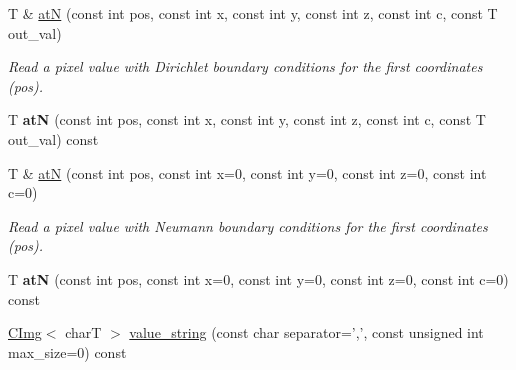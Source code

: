\begin{DoxyCompactItemize}
\item 
\hypertarget{structcimg__library_1_1CImgList_a54bb20ed86fec8372e1074b4f79735f9}{
T \& \hyperlink{structcimg__library_1_1CImgList_a54bb20ed86fec8372e1074b4f79735f9}{atN} (const int pos, const int x, const int y, const int z, const int c, const T out\_\-val)}
\label{structcimg__library_1_1CImgList_a54bb20ed86fec8372e1074b4f79735f9}

\begin{DoxyCompactList}\small\item\em Read a pixel value with Dirichlet boundary conditions for the first coordinates ({\ttfamily pos}). \item\end{DoxyCompactList}\item 
\hypertarget{structcimg__library_1_1CImgList_a052a1347ec91e03b593442ec5a3038a7}{
T {\bfseries atN} (const int pos, const int x, const int y, const int z, const int c, const T out\_\-val) const }
\label{structcimg__library_1_1CImgList_a052a1347ec91e03b593442ec5a3038a7}

\item 
\hypertarget{structcimg__library_1_1CImgList_afa925fa8e93eb8c1e1d625c47faf3ab1}{
T \& \hyperlink{structcimg__library_1_1CImgList_afa925fa8e93eb8c1e1d625c47faf3ab1}{atN} (const int pos, const int x=0, const int y=0, const int z=0, const int c=0)}
\label{structcimg__library_1_1CImgList_afa925fa8e93eb8c1e1d625c47faf3ab1}

\begin{DoxyCompactList}\small\item\em Read a pixel value with Neumann boundary conditions for the first coordinates ({\ttfamily pos}). \item\end{DoxyCompactList}\item 
\hypertarget{structcimg__library_1_1CImgList_afa02a998d8bb5dbdc93f5e56df9f8bcd}{
T {\bfseries atN} (const int pos, const int x=0, const int y=0, const int z=0, const int c=0) const }
\label{structcimg__library_1_1CImgList_afa02a998d8bb5dbdc93f5e56df9f8bcd}

\item 
\hypertarget{structcimg__library_1_1CImgList_a2d70c422e3e75e6cd810358486387300}{
\hyperlink{structcimg__library_1_1CImg}{CImg}$<$ charT $>$ \hyperlink{structcimg__library_1_1CImgList_a2d70c422e3e75e6cd810358486387300}{value\_\-string} (const char separator=',', const unsigned int max\_\-size=0) const }
\label{structcimg__library_1_1CImgList_a2d70c422e3e75e6cd810358486387300}


\end{DoxyCompactItemize}

